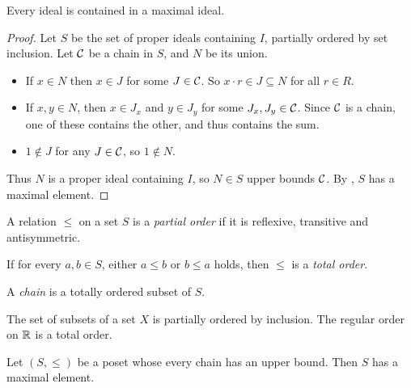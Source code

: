 \begin{theorem}
    Every ideal is contained in a maximal ideal.
\end{theorem}
\begin{proof}
    Let $S$ be the set of proper ideals containing $I$, partially ordered
    by set inclusion.
    Let $\mathcal{C}$ be a chain in $S$, and $N$ be its union.
    \begin{itemize}
        \item If $x \in N$ then $x \in J$ for some $J \in \mathcal{C}$.
            So $x \cdot r \in J \subseteq N$ for all $r \in R$.
        \item If $x, y \in N$, then $x \in J_x$ and $y \in J_y$ for some
            $J_x, J_y \in \mathcal{C}$.
            Since $\mathcal{C}$ is a chain, one of these contains the other,
            and thus contains the sum.
        \item $1 \notin J$ for any $J \in \mathcal{C}$, so $1 \notin N$.
    \end{itemize}
    Thus $N$ is a proper ideal containing $I$, so $N \in S$ upper bounds
    $\mathcal{C}$.
    By , $S$ has a maximal element.
\end{proof}

\begin{definition} \label{def:partial-order}
    A relation $\le$ on a set $S$ is a \emph{partial order} if it is
    reflexive, transitive and antisymmetric.

    If for every $a, b \in S$, either $a \le b$ or $b \le a$ holds, then
    $\le$ is a \emph{total order}.

    A \emph{chain} is a totally ordered subset of $S$.
\end{definition}
\begin{example}
    The set of subsets of a set $X$ is partially ordered by inclusion.
    The regular order on $\mathbb{R}$ is a total order.
\end{example}

\begin{theorem*} \label{zorn}
    Let $(S, \le)$ be a poset whose every chain has an upper bound.
    Then $S$ has a maximal element.
\end{theorem*}
